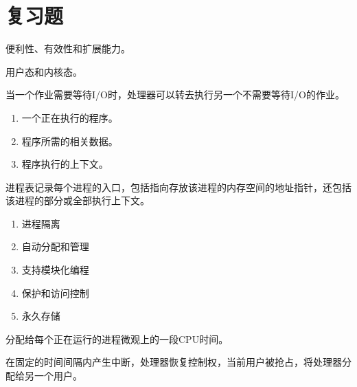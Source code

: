 
\section{复习题}
{
    \begin{reviewc}
        便利性、有效性和扩展能力。
    \end{reviewc}

    \begin{reviewc}
        用户态和内核态。
    \end{reviewc}

    \begin{reviewc}
        当一个作业需要等待I/O时，处理器可以转去执行另一个不需要等待I/O的作业。
    \end{reviewc}

    \begin{reviewc}
        \begin{enumerate}
            \item 一个正在执行的程序。
            \item 程序所需的相关数据。
            \item 程序执行的上下文。
        \end{enumerate}
    \end{reviewc}

    \begin{reviewc}
        进程表记录每个进程的入口，包括指向存放该进程的内存空间的地址指针，还包括该进程的部分或全部执行上下文。
    \end{reviewc}

    \begin{reviewc}
        \begin{enumerate}
            \item 进程隔离
            \item 自动分配和管理
            \item 支持模块化编程
            \item 保护和访问控制
            \item 永久存储
        \end{enumerate}
    \end{reviewc}

    \begin{reviewc}
        分配给每个正在运行的进程微观上的一段CPU时间。
    \end{reviewc}

    \begin{reviewc}
        在固定的时间间隔内产生中断，处理器恢复控制权，当前用户被抢占，将处理器分配给另一个用户。
    \end{reviewc}

}
